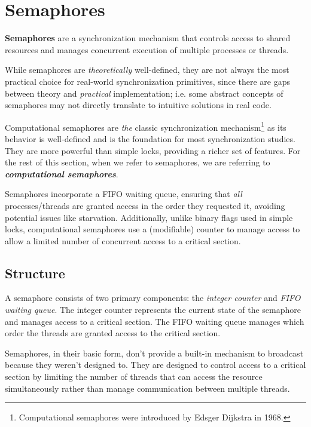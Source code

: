 \documentclass{report}
\newcommand{\definitionBegin}[1]{\begin{tcolorbox}[title={Definition: #1}]}
\newcommand{\definitionEnd}{\end{tcolorbox}}
\newcommand{\exampleBegin}[1]{\begin{tcolorbox}[colback=blue!5!white,colframe=black!75!blue,title={Example:
      #1}]}
\newcommand{\exampleEnd}{\end{tcolorbox}}
\newcommand{\asideBegin}[1]{\begin{tcolorbox}[colback=orange!5!white,colframe=black!75!orange,title={Aside:
      #1}]}
\newcommand{\asideEnd}{\end{tcolorbox}}
\newcommand{\corollaryBegin}[1]{\begin{tcolorbox}[colback=teal!5!white,colframe=black!75!teal,title={Corollary:
      #1}]}
\newcommand{\corollaryEnd}{\end{tcolorbox}}
\begin{document}
\section{Semaphores}
\definitionBegin{Semaphores}
\textbf{Semaphores} are a synchronization mechanism that controls access to shared resources and
manages concurrent execution of multiple processes or threads.
\definitionEnd

While semaphores are \textit{theoretically} well-defined, they are not always the most practical
choice for real-world synchronization primitives, since there are gaps between theory and
\textit{practical} implementation; i.e. some abstract concepts of semaphores may not directly
translate to intuitive solutions in real code. 


\corollaryBegin{Computational Semaphores}
Computational semaphores are \textit{the} classic synchronization mechanism\footnote{Computational
  semaphores were introduced by Edsger Dijkstra in 1968.} as its behavior is well-defined and is
the foundation for most synchronization studies. They are more powerful than simple locks, providing
a richer set of features. For the rest of this section, when we refer to semaphores, we are
referring to \textit{\textbf{computational semaphores}}.

\exampleBegin{Waiting in Line}
Semaphores incorporate a FIFO waiting queue, ensuring that \textit{all} processes/threads are
granted access in the order they requested it, avoiding potential issues like
starvation. Additionally, unlike binary flags used in simple locks, computational semaphores use a
(modifiable) counter to manage access to allow a limited number of concurrent access to a critical section. 
\exampleEnd
\corollaryEnd


\subsection{Structure}
A semaphore consists of two primary components: the \textit{integer counter} and \textit{FIFO
  waiting queue}. The integer counter represents the current state of the semaphore and manages
access to a critical section. The FIFO waiting queue manages which order the
threads are granted access to the critical section.


\asideBegin{Why Semaphores Don't Broadcast}
Semaphores, in their basic form, don't provide a built-in mechanism to broadcast because they
weren't designed to. They are designed to control access to a critical section by limiting the
number of threads that can access the resource simultaneously rather than manage communication
between multiple threads.  
\asideEnd
\end{document}
